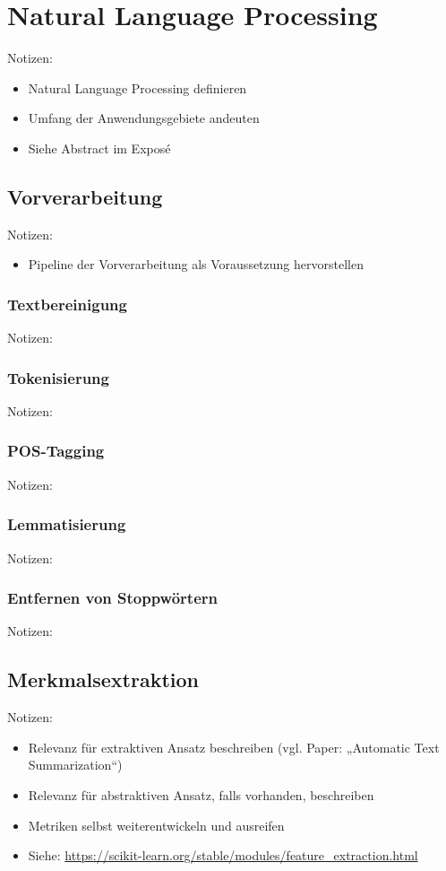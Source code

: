 \chapter{Natural Language Processing}
\thispagestyle{fancy}
\label{chap:Natural Language Processing}

Notizen:
\begin{itemize}
	\item Natural Language Processing definieren
	\item Umfang der Anwendungsgebiete andeuten
	\item Siehe Abstract im Exposé
\end{itemize}


\section{Vorverarbeitung}
Notizen:
\begin{itemize}
	\item Pipeline der Vorverarbeitung als Voraussetzung hervorstellen
\end{itemize}


\subsection{Textbereinigung}
Notizen:


\subsection{Tokenisierung}
Notizen:


\subsection{POS-Tagging}
Notizen:


\subsection{Lemmatisierung}
Notizen:


\subsection{Entfernen von Stoppwörtern}
Notizen:


\section{Merkmalsextraktion}
Notizen:
\begin{itemize}
	\item Relevanz für extraktiven Ansatz beschreiben (vgl. Paper: „Automatic Text Summarization“)
	\item Relevanz für abstraktiven Ansatz, falls vorhanden, beschreiben
	\item Metriken selbst weiterentwickeln und ausreifen
	\item Siehe: \url{https://scikit-learn.org/stable/modules/feature_extraction.html}
\end{itemize}


